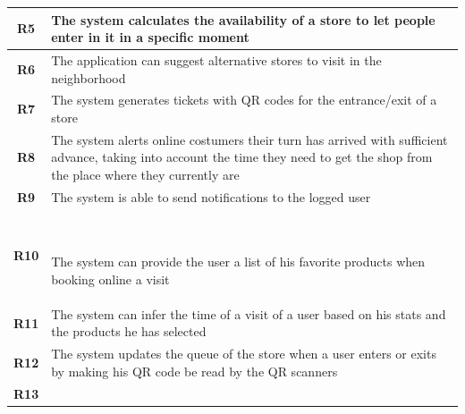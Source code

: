 \documentclass[]{article}
\begin{document}
\begin{tabular}{|c|l|}
				\\ \hline				
				\textbf{R5} &
					\begin{minipage}[t]{13cm}
						The system calculates the availability of a store to let people enter in it in a specific moment 
					\end{minipage}
				\\ \hline				
				\textbf{R6} & 
					\begin{minipage}[t]{13cm}
						The application can suggest alternative stores to visit in the neighborhood
					\end{minipage}
				\\ \hline				
				\textbf{R7} & 
					\begin{minipage}[t]{13cm}
						The system generates tickets with QR codes for the entrance/exit of a store							\end{minipage}
				\\ \hline				
				\textbf{R8} & 
					\begin{minipage}[t]{13cm}
						The system alerts online costumers their turn has arrived with sufficient advance, taking into account the time they need to get the shop from the place where they currently are
					\end{minipage}
				\\ \hline				
				\textbf{R9} & 
					\begin{minipage}[t]{13cm}
						The system is able to send notifications to the logged user
					\end{minipage}
				\\ \hline				
				\textbf{R10} & \
					\begin{minipage}[t]{13cm}
						The system can provide the user a list of his favorite products when booking online a visit
					\end{minipage}
				\\ \hline				
				\textbf{R11} & 
					\begin{minipage}[t]{13cm}
						The system can infer the time of a visit of a user based on his stats and the products he has selected
					\end{minipage}
				\\ \hline				
				\textbf{R12} & 
					\begin{minipage}[t]{13cm}
						The system updates the queue of the store when a user enters or exits by making his QR code be read by the QR scanners
					\end{minipage}
				\\ \hline				
				\textbf{R13} & 
					\begin{minipage}[t]{13cm}

\end{minipage}
\end{tabular}
\end{document}
